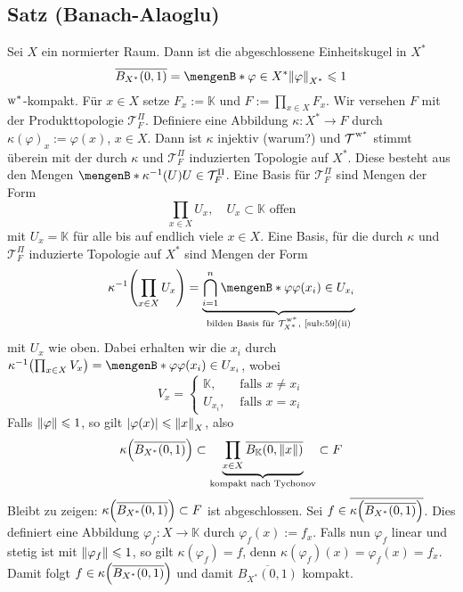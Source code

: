 \subsection{Satz (Banach-Alaoglu)} %
\label{sub:510}
Sei $X$ ein normierter Raum. Dann ist die abgeschlossene Einheitskugel in $X^*$
\[
	\overline{B_{X^*}(0,1)} = \set[\varphi \in X^*]{\norm[X^*]{\varphi} \le 1}  
\]
$\mathrm{w}^*$-kompakt.
Für $x \in X$ setze $F_x := \mathds{K}$ und $F := \prod_{x \in X} F_x$. Wir versehen $F$ mit der Produkttopologie $\mathcal{T}_F^\Pi$. Definiere eine Abbildung
$\kappa : X^* \to F$ durch $\kappa(\varphi)_x := \varphi(x)$, $x \in X$. Dann ist $\kappa$ injektiv (warum?) und $\weakTstar{ }$ stimmt überein mit der durch $\kappa$ und
$\mathcal{T}_F^\Pi$ induzierten Topologie auf $X^*$. Diese besteht aus den Mengen $\set[\kappa ^{-1}(U)]{U \in \mathcal{T}_F^\Pi}$. Eine Basis für $\mathcal{T}_F^\Pi$ sind
Mengen der Form 
\[
	\prod_{x \in X} U_x, \quad U_x \subset \mathds{K} \text{ offen} 
\]
mit $U_x = \mathds{K}$ für alle bis auf endlich viele $x \in X$. Eine Basis, für die durch
$\kappa$ und $\mathcal{T}_F^\Pi$ induzierte Topologie auf $X^*$ sind Mengen der Form
\[
	\kappa ^{-1} \enbrace*{ \prod_{x \in X} U_x} = \underbrace{\bigcap_{i=1}^n \set[\varphi]{\varphi(x_i) \in U_{x_i}} }_{
	\text{bilden Basis für $\weakTstar{X^*}$, \ref{sub:59}(ii)}}
\]
mit $U_x$ wie oben. Dabei erhalten wir die $x_i$ durch $\kappa ^{-1} \enbrace*{\prod_{x \in X} V_x} = \set[\varphi]{\varphi(x_i)\in U_{x_i}}$, wobei 
\[
	V_x = \begin{cases}
		\mathds{K}, &\text{ falls } x \not= x_i\\
		U_{x_i}, &\text{ falls } x=x_i
	\end{cases}
\]
Falls $\norm{\varphi} \le 1$, so gilt $\abs*{\varphi(x)} \le \norm[X]{x}$, also 
\[
	\kappa \enbrace*{\overline{B_{X^*}(0,1)}} \subset \underbrace{\prod_{x \in X} \overline{B_{\mathds{K}}(0, \norm{x})}}_{\text{kompakt nach Tychonov}} \subset F
\]
Bleibt zu zeigen: $\kappa \enbrace*{\overline{B_{X^*}(0,1)}} \subset F$ ist abgeschlossen. Sei $f \in \overline{\kappa \enbrace*{\overline{B_{X^*}(0,1)}}}$. Dies definiert
eine Abbildung $\varphi_f : X \to \mathds{K}$ durch $\varphi_f(x) := f_x$. Falls nun $\varphi_f$ linear und stetig ist mit $\norm{\varphi_f} \le 1$, so gilt
$\kappa(\varphi_f) = f$, denn $\kappa(\varphi_f)(x) = \varphi_f(x) = f_x$. Damit folgt $f \in \kappa \enbrace*{ \overline{B_{X^*}(0,1)}}$ und damit 
$\overline{B_{X^*}(0,1)}$ kompakt.
